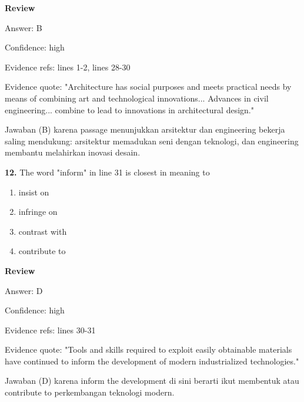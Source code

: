 \documentclass[12pt]{article}
\begin{document}
\par
\begingroup
\setlength{\parskip}{0pt}
\setlength{\parindent}{0pt}
\textbf{Review}\par
Answer: B\par
Confidence: high\par
Evidence refs: lines 1-2, lines 28-30\par
Evidence quote: "Architecture has social purposes and meets practical needs by means of combining art and technological innovations... Advances in civil engineering... combine to lead to innovations in architectural design."\par
Jawaban (B) karena passage menunjukkan arsitektur dan engineering bekerja saling mendukung: arsitektur memadukan seni dengan teknologi, dan engineering membantu melahirkan inovasi desain.\par
\endgroup
\par
\vspace{0.25\baselineskip}
\noindent\textbf{12.} The word "inform" in line 31 is closest in meaning to
\begin{enumerate}[label=(\Alph*),leftmargin=*,itemsep=0.2em]
\item insist on
\item infringe on
\item contrast with
\item contribute to
\end{enumerate}
\par
\begingroup
\setlength{\parskip}{0pt}
\setlength{\parindent}{0pt}
\textbf{Review}\par
Answer: D\par
Confidence: high\par
Evidence refs: lines 30-31\par
Evidence quote: "Tools and skills required to exploit easily obtainable materials have continued to inform the development of modern industrialized technologies."\par
Jawaban (D) karena inform the development di sini berarti ikut membentuk atau contribute to perkembangan teknologi modern.\par
\endgroup
\par
\vspace{0.25\baselineskip}
\end{document}
